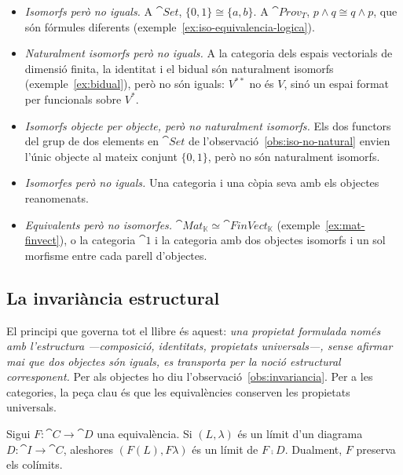 \begin{itemize}
\item \emph{Isomorfs però no iguals.} A $\cat{Set}$, $\{0,1\}\cong\{a,b\}$. A $\cat{Prov}_T$, $p\land q\cong q\land p$, que són fórmules diferents (exemple~\ref{ex:iso-equivalencia-logica}).
\item \emph{Naturalment isomorfs però no iguals.} A la categoria dels espais vectorials de dimensió finita, la identitat i el bidual són naturalment isomorfs (exemple~\ref{ex:bidual}), però no són iguals: $V^{**}$ no és $V$, sinó un espai format per funcionals sobre $V^{*}$.
\item \emph{Isomorfs objecte per objecte, però no naturalment isomorfs.} Els dos functors del grup de dos elements en $\cat{Set}$ de l'observació~\ref{obs:iso-no-natural} envien l'únic objecte al mateix conjunt $\{0,1\}$, però no són naturalment isomorfs.
\item \emph{Isomorfes però no iguals.} Una categoria i una còpia seva amb els objectes reanomenats.
\item \emph{Equivalents però no isomorfes.} $\cat{Mat}_{\mathbb K}\simeq\cat{FinVect}_{\mathbb K}$ (exemple~\ref{ex:mat-finvect}), o la categoria $\cat{1}$ i la categoria amb dos objectes isomorfs i un sol morfisme entre cada parell d'objectes.
\end{itemize}

\subsection{La invariància estructural}

El principi que governa tot el llibre és aquest: \emph{una propietat formulada només amb l'estructura ---composició, identitats, propietats universals---, sense afirmar mai que dos objectes són iguals, es transporta per la noció estructural corresponent.} Per als objectes ho diu l'observació~\ref{obs:invariancia}. Per a les categories, la peça clau és que les equivalències conserven les propietats universals.

\begin{teorema}\label{teo:equivalencia-limits}
Sigui $F\colon\cat{C}\to\cat{D}$ una equivalència. Si $(L,\lambda)$ és un límit d'un diagrama $D\colon\cat{I}\to\cat{C}$, aleshores $(F(L),F\lambda)$ és un límit de $F\comp D$. Dualment, $F$ preserva els colímits.
\end{teorema}


